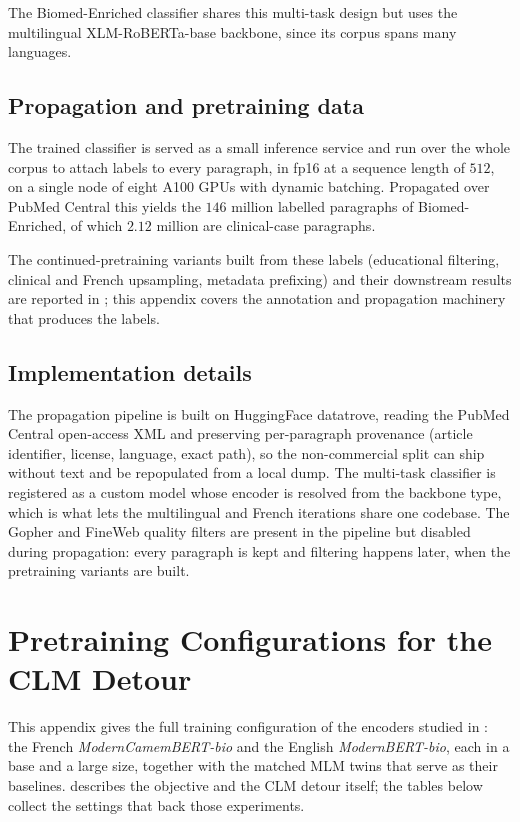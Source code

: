 The Biomed-Enriched classifier shares this multi-task design but uses the
multilingual XLM-RoBERTa-base backbone, since its corpus spans many languages.

\section{Propagation and pretraining data}

The trained classifier is served as a small inference service and run over the whole
corpus to attach labels to every paragraph, in fp16 at a sequence length of $512$, on
a single node of eight A100 GPUs with dynamic batching. Propagated over PubMed Central
this yields the $146$ million labelled paragraphs of Biomed-Enriched, of which
$2.12$ million are clinical-case paragraphs.

The continued-pretraining variants built from these labels (educational filtering,
clinical and French upsampling, metadata prefixing) and their downstream results are
reported in ; this appendix covers the annotation and propagation
machinery that produces the labels.

\section{Implementation details}

The propagation pipeline is built on HuggingFace datatrove, reading the PubMed Central
open-access XML and preserving per-paragraph provenance (article identifier, license,
language, exact path), so the non-commercial split can ship without text and be
repopulated from a local dump. The multi-task classifier is registered as a custom
model whose encoder is resolved from the backbone type, which is what lets the
multilingual and French iterations share one codebase. The Gopher and FineWeb quality
filters are present in the pipeline but disabled during propagation: every paragraph is
kept and filtering happens later, when the pretraining variants are built.

\chapter{Pretraining Configurations for the CLM Detour}
\label{app:clm-pretraining}

This appendix gives the full training configuration of the encoders studied in
: the French \emph{ModernCamemBERT-bio} and the English
\emph{ModernBERT-bio}, each in a base and a large size, together with the matched
MLM twins that serve as their baselines.  describes the
objective and the CLM detour itself; the tables below collect the settings that
back those experiments.

